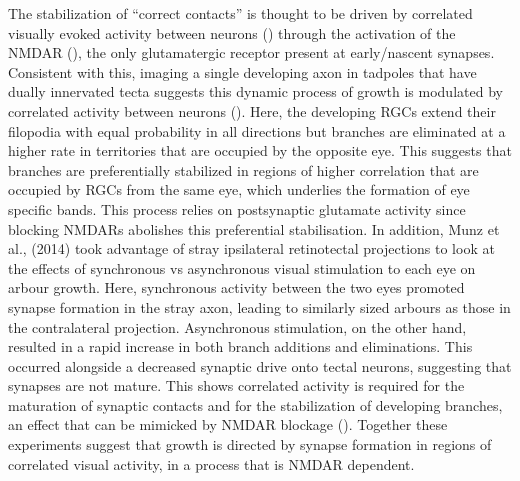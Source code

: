 The stabilization of “correct contacts” is thought to be driven by correlated visually evoked activity between neurons (\cite{Ruthazer2006StabilizationMaturation}) through the activation of the NMDAR (\cite{Ruthazer2003ControlVivo}), the only glutamatergic receptor present at early/nascent synapses. Consistent with this, imaging a single developing axon in tadpoles that have dually innervated tecta suggests this dynamic process of growth is modulated by correlated activity between neurons (\cite{Ruthazer2003ControlVivo}). Here, the developing RGCs extend their filopodia with equal probability in all directions but branches are eliminated at a higher rate in territories that are occupied by the opposite eye. This suggests that branches are preferentially stabilized in regions of higher correlation that are occupied by RGCs from the same eye, which underlies the formation of eye specific bands. This process relies on postsynaptic glutamate activity since  blocking NMDARs abolishes this preferential stabilisation. In addition, Munz et al., (2014) took advantage of stray ipsilateral retinotectal projections to look at the effects of synchronous vs asynchronous visual stimulation to each eye on arbour growth. Here, synchronous activity between the two eyes promoted synapse formation in the stray axon, leading to similarly sized arbours as those in the contralateral projection. Asynchronous stimulation, on the other hand, resulted in a rapid increase in both branch additions and eliminations. This occurred alongside a decreased synaptic drive onto tectal neurons, suggesting that synapses are not mature. This shows correlated activity is required for the maturation of synaptic contacts and for the stabilization of developing branches, an effect that can be mimicked by NMDAR blockage (\cite{Munz2014RapidStimulation}). Together these experiments suggest that growth is directed by synapse formation in regions of correlated visual activity, in a process that is NMDAR dependent.

